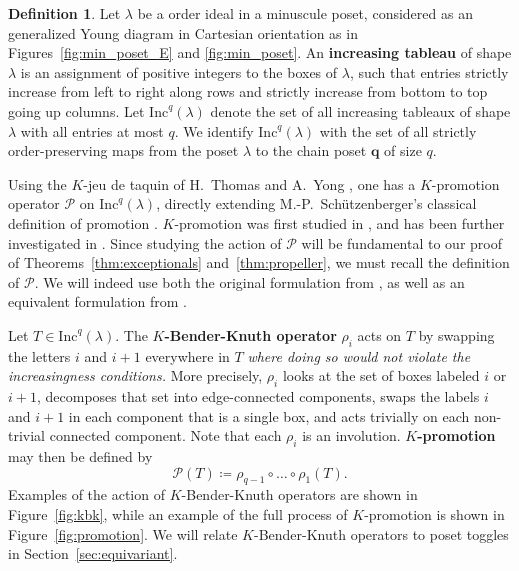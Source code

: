 \documentclass[12pt]{amsart}
\theoremstyle{definition}
\newtheorem{definition}[theorem]{Definition}
\theoremstyle{remark}
\numberwithin{equation}{section}
\newcommand{\inc}{\ensuremath{\mathrm{Inc}}}
\newcommand{\pro}{\mathcal{P}}
\begin{document}
\begin{definition}
Let $\lambda$ be a order ideal in a minuscule poset, considered as an generalized Young diagram in Cartesian orientation as in Figures~\ref{fig:min_poset_E} and \ref{fig:min_poset}. An {\bf increasing tableau} of shape $\lambda$ is an assignment of positive integers to the boxes of $\lambda$, such that entries strictly increase from left to right along rows and strictly increase from bottom to top going up columns. Let $\inc^q(\lambda)$ denote the set of all increasing tableaux of shape $\lambda$ with all entries at most $q$. We identify $\inc^q(\lambda)$ with the set of all strictly order-preserving maps from the poset $\lambda$ to the chain poset $\mathbf{q}$ of size $q$.
\end{definition}

Using the $K$-jeu de taquin of H.~Thomas and A.~Yong \cite{Thomas.Yong:K}, one has a $K$-promotion operator $\pro$ on $\inc^q(\lambda)$, directly extending M.-P.~Sch\"utzenberger's classical definition of promotion \cite{Schutzenberger:promotion}. $K$-promotion was first studied in \cite{Pechenik}, and has been further investigated in \cite{BPS, Pressey.Stokke.Visentin, Rhoades:skein, DPS, Pechenik:frames,Vorland}. Since studying the action of $\pro$ will be fundamental to our proof of Theorems~\ref{thm:exceptionals} and~\ref{thm:propeller}, we must recall the definition of $\pro$. 
We will indeed use both the original formulation from \cite{Pechenik}, as well as an equivalent formulation from \cite[Proposition~2.4]{DPS}.

Let $T \in \inc^q(\lambda)$. The {\bf $K$-Bender-Knuth operator} $\rho_i$ acts on $T$ by swapping the letters $i$ and $i+1$ everywhere in $T$ \emph{where doing so would not violate the increasingness conditions.} More precisely, $\rho_i$ looks at the set of boxes labeled $i$ or $i+1$, decomposes that set into edge-connected components, swaps the labels $i$ and $i+1$ in each component that is a single box, and acts trivially on each non-trivial connected component. 
Note that each $\rho_i$ is an involution.
{\bf $K$-promotion} may then be defined by
\[
\pro(T) \coloneqq \rho_{q-1} \circ \dots \circ \rho_1(T).
\]
Examples of the action of $K$-Bender-Knuth operators are shown in Figure~\ref{fig:kbk}, while an example of the full process of $K$-promotion is shown in Figure~\ref{fig:promotion}. We will relate $K$-Bender-Knuth operators to poset toggles in Section~\ref{sec:equivariant}.
\end{document}
